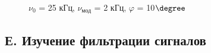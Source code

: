 \documentclass[a4paper,12pt]{article}
\theoremstyle{definition}
\begin{document}
\begin{enumerate}
\begin{figure}[h]
\begin{minipage}[h]{0.44\linewidth}
 $\nu_0$ = 25 кГц, $\nu_\text{мод}$ = 2 кГц, $\varphi$ = 10$\degree$  \\
\end{minipage}
\label{ris:experimentalcorrelationsignals}
\end{figure}




\end{enumerate}


\newpage










\subsection*{Е. Изучение фильтрации сигналов}
\end{document}
